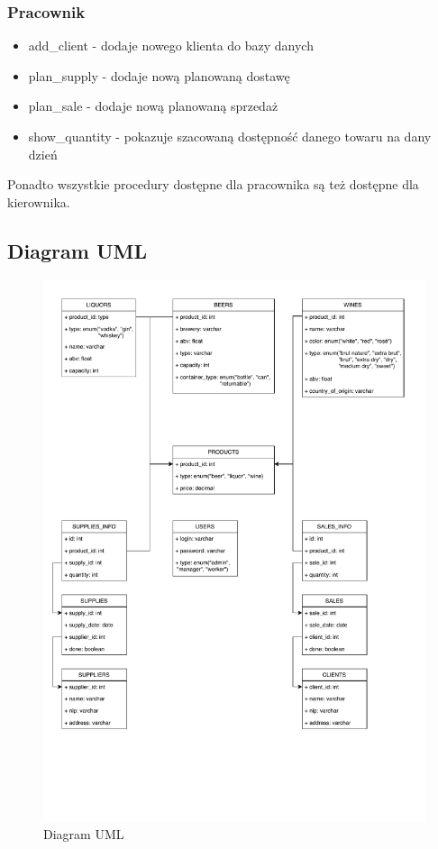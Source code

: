 \documentclass[12pt,a4paper]{article}
\begin{document}
    \subsubsection*{Pracownik}
        \begin{itemize}
            \item \textsf{add\_client} - dodaje nowego klienta do bazy danych
            \item \textsf{plan\_supply} - dodaje nową planowaną dostawę
            \item \textsf{plan\_sale} - dodaje nową planowaną sprzedaż
            \item \textsf{show\_quantity} - pokazuje szacowaną dostępność danego towaru na dany dzień
        \end{itemize}
        
        Ponadto wszystkie procedury dostępne dla pracownika są też dostępne dla kierownika.
        
\subsection*{Diagram UML}
        
\begin{figure}
    \centering
    \includegraphics[width=\columnwidth]{uml}
    \caption{Diagram UML}
    \label{fig:diagram}
\end{figure}
    
    
\end{document}
